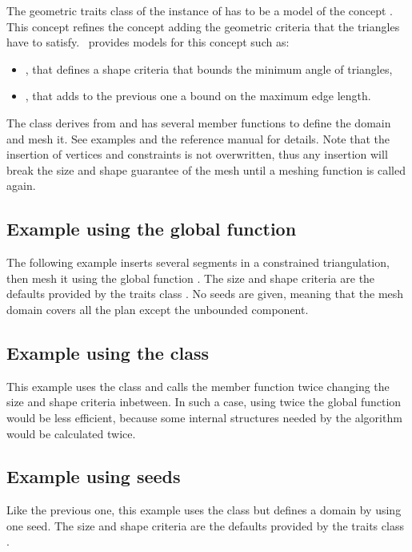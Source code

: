 The geometric traits class of the instance of  has to be a
model of the concept .  This concept
refines the concept 
adding the geometric criteria that the triangles have to satisfy.
\cgal\ provides models for this concept such as:
\begin{itemize}
\item {}, that defines a shape criteria
  that bounds the minimum angle of triangles, 
\item {}, that adds to the previous one a
  bound on the maximum edge length.
\end{itemize}

The class  derives from  and has
several member functions to define the domain and mesh it. See examples
and the reference manual for details.  Note that the insertion of
vertices and constraints is not overwritten, thus any insertion will
break the size and shape guarantee of the mesh until a meshing
function is called again.

\subsection{Example using the global function}

The following example inserts several segments in a constrained
  triangulation, then mesh it using the global function
  . The size and shape criteria are the
  defaults provided by the traits class
  . No seeds are given, meaning that
  the mesh domain covers all the plan except the unbounded component.


\subsection{Example using the class }

This example uses the class  and calls
  the  member function twice changing the size and
  shape criteria inbetween. In such a case, using twice the global
  function  would be less efficient,
  because some internal structures needed by the algorithm would be
  calculated twice.


\subsection{Example using seeds}

Like the previous one, this example uses the class
   but defines a domain by using one seed.
  The size and shape criteria are the defaults provided by the traits
  class .


